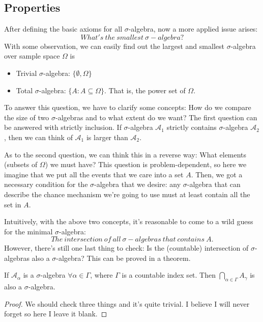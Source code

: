 \documentclass[11pt]{report}
\begin{document}
\subsection{Properties}
After defining the basic axioms for all $\sigma$-algebra, now a more applied issue arises:
$$What's\ the\ smallest\ \sigma-algebra?$$
With some observation, we can easily find out the largest and smallest $\sigma$-algebra over sample space $\Omega$ is
\begin{itemize}
	\item Trivial $\sigma$-algebra: $\{\emptyset,\Omega \}$
	\item Total $\sigma$-algebra: $\{A:A\subseteq\Omega \}$. That is, the power set of $\Omega$.
\end{itemize}
To answer this question, we have to clarify some concepts: How do we compare the size of two $\sigma$-algebras and to what extent do we want? The first question can be answered with strictly inclusion. If $\sigma$-algebra $\mathcal{A}_1$ strictly contains $\sigma$-algebra $\mathcal{A}_2$, then we can think of $\mathcal{A}_1$ is larger than $\mathcal{A}_2$. 

As to the second question, we can think this in a reverse way: What elements (subsets of $\Omega$) we must have? This question is problem-dependent, so here we imagine that we put all the events that we care into a set $A$. Then, we got a necessary condition for the $\sigma$-algebra that we desire: any $\sigma$-algebra that can describe the chance mechanism we're going to use must at least contain all the set in $A$.

Intuitively, with the above two concepts, it's reasonable to come to a wild guess for the minimal $\sigma$-algebra:
$$The\ intersection\ of\ all\ \sigma-algebras\ that\ contains\ A.$$
However, there's still one last thing to check: Is the (countable) intersection of $\sigma$-algebras also a $\sigma$-algebra? This can be proved in a theorem.
\begin{theorem}
	\mbox{}
	
	If $\mathcal{A}_{\alpha}$ is a $\sigma$-algebra $\forall \alpha\in\Gamma$, where $\Gamma$ is a countable index set. Then $\bigcap_{\alpha\in\Gamma}A_{\gamma}$ is also a $\sigma$-algebra.
\end{theorem}
\begin{proof}
	We should check three things and it's quite trivial. I believe I will never forget so here I leave it blank.
\end{proof}
\end{document}
